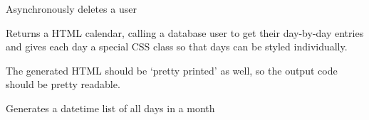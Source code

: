 \documentclass[letterpaper,10pt,english]{sphinxmanual}
\begin{document}

\begin{fulllineitems}
\label{code:timetracker.utils.calendar_utils.delete_user}
Asynchronously deletes a user

\end{fulllineitems}


\begin{fulllineitems}
\label{code:timetracker.utils.calendar_utils.gen_calendar}
Returns a HTML calendar, calling a database user to get their day-by-day
entries and gives each day a special CSS class so that days can be styled
individually.

The generated HTML should be `pretty printed' as well, so the output code
should be pretty readable.

\end{fulllineitems}


\begin{fulllineitems}
\label{code:timetracker.utils.calendar_utils.gen_datetime_cal}
Generates a datetime list of all days in a month

\end{fulllineitems}

\end{document}
